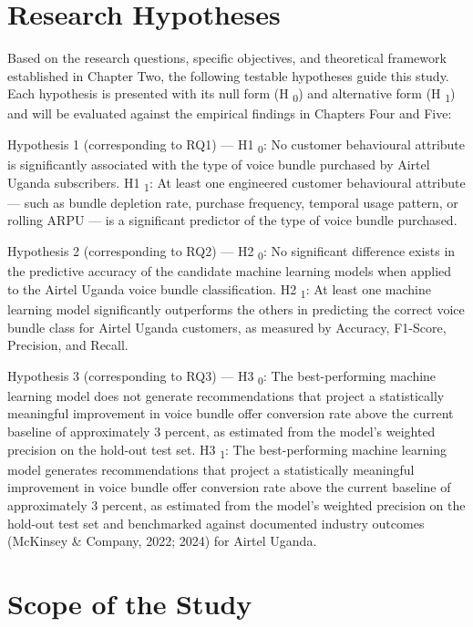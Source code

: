 \section{Research Hypotheses}

Based on the research questions, specific objectives, and theoretical framework established in Chapter Two, the following testable hypotheses guide this study. Each hypothesis is presented with its null form (H	\textsubscript{0}) and alternative form (H	\textsubscript{1}) and will be evaluated against the empirical findings in Chapters Four and Five:

Hypothesis 1 (corresponding to RQ1) --- H1	\textsubscript{0}: No customer behavioural attribute is significantly associated with the type of voice bundle purchased by Airtel Uganda subscribers. H1	\textsubscript{1}: At least one engineered customer behavioural attribute --- such as bundle depletion rate, purchase frequency, temporal usage pattern, or rolling ARPU --- is a significant predictor of the type of voice bundle purchased.

Hypothesis 2 (corresponding to RQ2) --- H2	\textsubscript{0}: No significant difference exists in the predictive accuracy of the candidate machine learning models when applied to the Airtel Uganda voice bundle classification. H2	\textsubscript{1}: At least one machine learning model significantly outperforms the others in predicting the correct voice bundle class for Airtel Uganda customers, as measured by Accuracy, F1-Score, Precision, and Recall.

Hypothesis 3 (corresponding to RQ3) --- H3	\textsubscript{0}: The best-performing machine learning model does not generate recommendations that project a statistically meaningful improvement in voice bundle offer conversion rate above the current baseline of approximately 3 percent, as estimated from the model's weighted precision on the hold-out test set. H3	\textsubscript{1}: The best-performing machine learning model generates recommendations that project a statistically meaningful improvement in voice bundle offer conversion rate above the current baseline of approximately 3 percent, as estimated from the model's weighted precision on the hold-out test set and benchmarked against documented industry outcomes (McKinsey \& Company, 2022; 2024) for Airtel Uganda.


\section{Scope of the Study}


